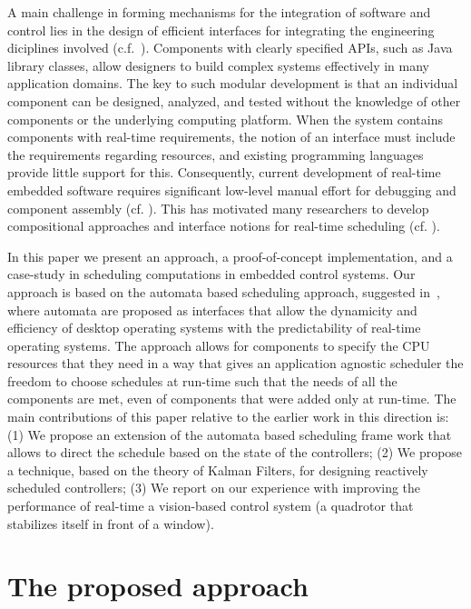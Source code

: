 \documentclass{sig-alternate-ipsn13}
\begin{document}
A main challenge in forming mechanisms for the integration of software and control lies in the design of efficient interfaces for integrating the engineering diciplines involved (c.f.~\cite{weiss2007automata}). Components with clearly specified APIs, such as Java library classes, allow designers to build
complex systems effectively in many application domains.  The key to such modular development is
that an individual component can be designed, analyzed, and tested without the knowledge of other
components or the underlying computing platform. When the system contains components with
real-time requirements, the notion of an interface must include the requirements regarding
resources, and existing programming languages provide little support for this.  Consequently,
current development of real-time embedded software requires significant low-level manual effort for
debugging and component assembly (cf.  \cite{Lee00,IEEE03,HS06}).  This has motivated many
researchers to develop compositional approaches and interface notions for real-time scheduling (cf.
\cite{RS01,dH01,MF01,CAHS03,SL08,SLBS04,TWS06,DBLP:conf/lctrts/AuerbachBIKRRT07}).


In this paper we present an approach, a proof-of-concept implementation, and a case-study in scheduling computations in embedded control systems. Our approach is based on the automata based scheduling approach, suggested in~\cite{WA07,RTComposer,AW08}, where automata are proposed as interfaces that allow the dynamicity and efficiency of desktop operating systems with the predictability of real-time operating systems. The approach allows for components to specify the CPU resources that they need in a way that gives an application agnostic scheduler the freedom to choose schedules at run-time such that the needs of all the components are met, even of components that were added only at run-time.  The main contributions of this paper relative to the earlier work in this direction is:
(1) We propose an extension of the automata based scheduling frame work that allows to direct the schedule based on the state of the controllers; (2) We propose a technique, based on the theory of Kalman Filters, for designing reactively scheduled controllers; (3) We report on our experience with improving the performance of real-time a vision-based control system (a quadrotor that stabilizes itself in front of a window).

\section{The proposed approach}
\label{sec:architecture}
\end{document}
